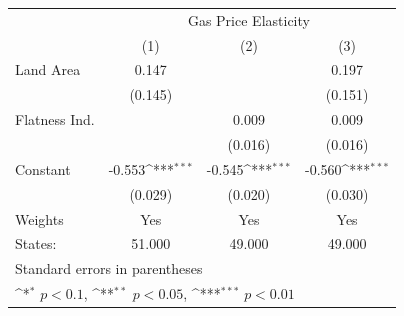 {
\def\sym#1{\ifmmode^{#1}\else\(^{#1}\)\fi}
\begin{tabular}{l*{3}{c}}
\hline\hline
            &\multicolumn{3}{c}{Gas Price Elasticity}                         \\
            &\multicolumn{1}{c}{(1)}         &\multicolumn{1}{c}{(2)}         &\multicolumn{1}{c}{(3)}         \\
\hline
Land Area   &       0.147         &                     &       0.197         \\
            &     (0.145)         &                     &     (0.151)         \\
[1em]
Flatness Ind.&                     &       0.009         &       0.009         \\
            &                     &     (0.016)         &     (0.016)         \\
[1em]
Constant    &      -0.553\sym{***}&      -0.545\sym{***}&      -0.560\sym{***}\\
            &     (0.029)         &     (0.020)         &     (0.030)         \\
\hline
Weights     &         Yes         &         Yes         &         Yes         \\
States:     &      51.000         &      49.000         &      49.000         \\
\hline\hline
\multicolumn{4}{l}{\footnotesize Standard errors in parentheses}\\
\multicolumn{4}{l}{\footnotesize \sym{*} \(p<0.1\), \sym{**} \(p<0.05\), \sym{***} \(p<0.01\)}\\
\end{tabular}
}
